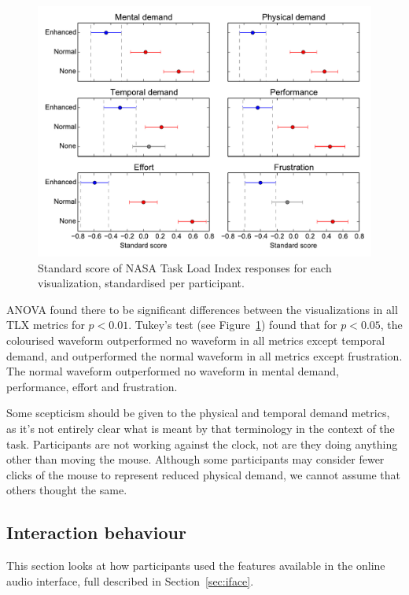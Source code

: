 \begin{figure}[p]
  \centering
  \includegraphics[width=\textwidth]{figs/tlx-std-tukey95.pdf}
  \caption{Standard score of NASA Task Load Index responses for each visualization, standardised per participant.}
  \label{fig:tlxtukey}
\end{figure}

ANOVA found there to be significant differences between the visualizations in all TLX metrics for $p < 0.01$. Tukey's
test (see Figure~\ref{fig:tlxtukey}) found that for $p < 0.05$, the colourised waveform outperformed no waveform in all
metrics except temporal demand, and outperformed the normal waveform in all metrics except frustration. The normal
waveform outperformed no waveform in mental demand, performance, effort and frustration.

Some scepticism should be given to the physical and temporal demand metrics, as it's not entirely clear what is meant
by that terminology in the context of the task. Participants are not working against the clock, not are they doing
anything other than moving the mouse. Although some participants may consider fewer clicks of the mouse to represent
reduced physical demand, we cannot assume that others thought the same.

\subsection{Interaction behaviour}
This section looks at how participants used the features available in the online audio interface, full described in
Section~\ref{sec:iface}.

